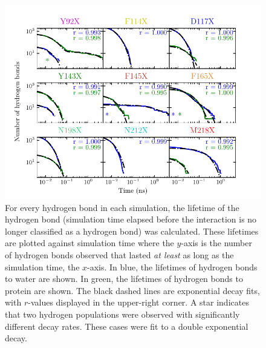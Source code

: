 \begin{figure}
    \center
    \includegraphics[width=\double]{figures-gfp-hbond/Lifetime_hbonds.pdf}
    \caption{
        For every hydrogen bond in each simulation, the lifetime of the hydrogen bond (simulation time elapsed before the interaction is no longer classified as a hydrogen bond) was calculated. 
        These lifetimes are plotted against simulation time where the $y$-axis is the number of hydrogen bonds observed that lasted \emph{at least} as long as the simulation time, the $x$-axis. 
        In blue, the lifetimes of hydrogen bonds to water are shown. 
        In green, the lifetimes of hydrogen bonds to protein are shown. 
        The black dashed lines are exponential decay fits, with $r$-values displayed in the upper-right corner. 
        A star indicates that two hydrogen populations were observed with significantly different decay rates. 
        These cases were fit to a double exponential decay.
    }
    \label{fig:hbond-lifetimes}
\end{figure}

